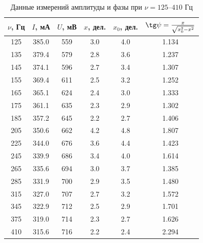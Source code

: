 \documentclass[12pt]{extarticle}
\begin{document}
	
\begin{table}[H]
	\centering
	\caption{Данные измерений амплитуды и фазы при $\nu = 125\text{--}410\text{ Гц}$}
	\label{tab:phase_low}
	\begin{tabular}{cccccc}
		\toprule
		$\nu$, Гц & $I$, мА & $U$, мВ & $x$, дел. & $x_0$, дел. & $\tg\psi = \frac{x}{\sqrt{x_0^2 - x^2}}$ \\
		\midrule
		125 & 385.0 & 559 & 3.0 & 4.0 & 1.134 \\
		135 & 379.4 & 579 & 2.8 & 3.6 & 1.237 \\
		145 & 374.1 & 596 & 2.7 & 3.4 & 1.307 \\
		155 & 369.4 & 611 & 2.5 & 3.2 & 1.252 \\
		165 & 365.1 & 624 & 2.4 & 3.0 & 1.333 \\
		175 & 361.1 & 635 & 2.3 & 2.9 & 1.302 \\
		185 & 357.2 & 645 & 2.2 & 2.7 & 1.406 \\
		205 & 350.6 & 662 & 4.2 & 4.8 & 1.807 \\
		225 & 344.0 & 676 & 3.6 & 4.4 & 1.423 \\
		245 & 339.9 & 686 & 3.4 & 4.0 & 1.614 \\
		265 & 335.6 & 694 & 3.0 & 3.7 & 1.385 \\
		285 & 331.9 & 700 & 2.9 & 3.5 & 1.480 \\
		315 & 327.0 & 707 & 2.7 & 3.2 & 1.572 \\
		345 & 322.9 & 712 & 2.5 & 2.9 & 1.701 \\
		375 & 319.0 & 714 & 2.3 & 2.7 & 1.626 \\
		410 & 315.6 & 716 & 2.2 & 2.4 & 2.294 \\
		\bottomrule
	\end{tabular}
\end{table}
\end{document}
